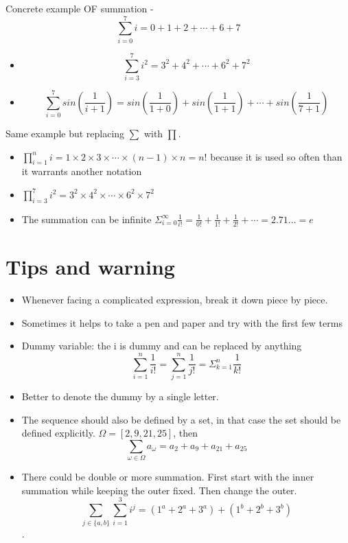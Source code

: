 \documentclass[
  letterpaper,
  DIV=11,
  numbers=noendperiod]{scrreprt}
\providecommand{\tightlist}{%
  \setlength{\itemsep}{0pt}\setlength{\parskip}{0pt}}
\begin{document}
Concrete example OF summation -
\[\sum_{i=0}^7 i = 0 + 1 + 2 + \cdots + 6 + 7\]

\begin{itemize}
\tightlist
\item
  \[ \sum_{i=3}^7 i^2 =  3^2 + 4^2 + \cdots + 6^2 + 7^2 \]
\item
  \[
     \sum_{i=0}^7 sin(\frac{1}{i+1}) = sin(\frac{1}{1+ 0}) + sin   (\frac{1}{ 1+ 1}) + \cdots + sin(\frac{1}{7+1})
  \]
\end{itemize}

Same example but replacing \(\sum\) with \(\prod\).

\begin{itemize}
\item
  \(\prod_{i = 1}^n i = 1 \times 2 \times 3 \times \cdots \times (n-1) \times n = n!\)
  because it is used so often than it warrants another notation
\item
  \(\prod_{i=3}^7 i^2 = 3^2 \times 4^2 \times  \cdots \times 6^2 \times 7^2\)
\item
  The summation can be infinite
  \(\Sigma_{i = 0}^\infty \frac{1}{i!} = \frac{1}{0!} + \frac{1}{1!} +\frac{1}{2!} + \cdots = 2.71\ldots = e\)
\end{itemize}

\section*{Tips and warning}\label{tips-and-warning-2}


\begin{itemize}
\item
  Whenever facing a complicated expression, break it down piece by
  piece.
\item
  Sometimes it helps to take a pen and paper and try with the first few
  terms
\item
  Dummy variable: the i is dummy and can be replaced by anything \[
    \sum_{i = 1}^n \frac{1}{i!} = \sum_{j = 1}^n \frac{1}{j!} = \Sigma_{k = 1}^n \frac{1}{k!}
   \]
\item
  Better to denote the dummy by a single letter.
\item
  The sequence should also be defined by a set, in that case the set
  should be defined explicitly. \(\Omega = [2, 9, 21, 25]\), then \[
   \sum_{\omega \in \Omega} a_\omega = a_2 + a_9 + a_{21} + a_{25}
  \]
\item
  There could be double or more summation. First start with the inner
  summation while keeping the outer fixed. Then change the outer. \[
    \sum_{j \in \{a, b\}} \sum_{i=1}^3 i ^ j =
   ( 1 ^ a + 2 ^ a + 3 ^ a )+ (1 ^ b  + 2 ^ b + 3 ^ b)
    \].
\end{itemize}
\end{document}
